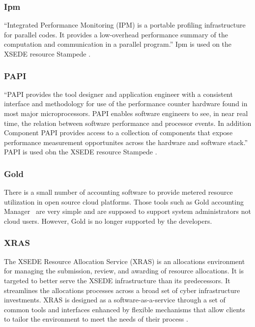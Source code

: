 \documentclass{sig-alternate-05-2015}
\begin{document}
\subsubsection{Ipm} 

``Integrated Performance Monitoring (IPM) is a portable profiling infrastructure for parallel codes. It provides a low-overhead performance summary of the computation and communication in a parallel program.'' \cite{Shan:2010:ProgModels,Fuerlinger:2010:PetascaleIPMP,ipm-github,ipm10} Ipm is used on the XSEDE resource Stampede \cite{stampede-tacc}.

\subsubsection{PAPI}

``PAPI provides the tool designer and application engineer with a consistent interface and methodology for use of the performance counter hardware found in most major microprocessors. PAPI enables software engineers to see, in near real time, the relation between software performance and processor events. In addition Component PAPI provides access to a collection of components that expose performance measurement opportunites across the hardware and software stack.''  PAPI is used obn the XSEDE resource Stampede \cite{stampede-tacc}.

\subsubsection{Gold}

There is a small number of accounting software to provide metered resource utilization in open source cloud platforms. Those tools such as Gold accounting Manager~\cite{jacksongold,gold-allocation} are very simple and are supposed to support system administrators not cloud users. However, Gold is no longer supported by the developers.


\subsubsection{XRAS}

The XSEDE Resource Allocation Service (XRAS) is an allocations environment for managing the submission, review, and awarding of resource allocations. It is targeted to better serve the XSEDE infrastructure than its predecessors. It streamlines the allocations processes across a broad set of cyber infrastructure investments. XRAS is designed as a software-as-a-service through a set of common tools and interfaces enhanced by flexible mechanisms that allow clients to tailor the environment to meet the needs of their process \cite{hart2014xras}.
\end{document}
